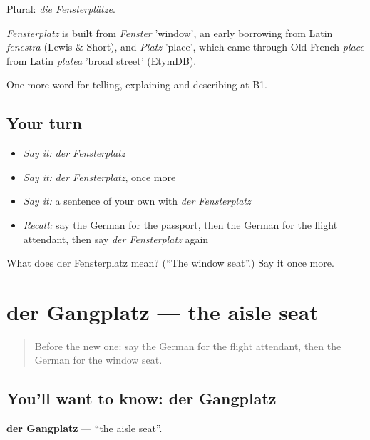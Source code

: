 Plural: \emph{die Fensterplätze}.

\begin{cousinweb}
\emph{Fensterplatz} is built from \emph{Fenster} 'window', an early borrowing from Latin \emph{fenestra} (Lewis \& Short), and \emph{Platz} 'place', which came through Old French \emph{place} from Latin \emph{platea} 'broad street' (EtymDB).
\end{cousinweb}

\begin{grammarlens}[title={What you've built}]
One more word for telling, explaining and describing at B1.
\end{grammarlens}

\subsection*{Your turn}
\begin{itemize}
\raggedright
  \item \emph{Say it:} \emph{der Fensterplatz}
  \item \emph{Say it:} \emph{der Fensterplatz}, once more
  \item \emph{Say it:} a sentence of your own with \emph{der Fensterplatz}
  \item \emph{Recall:} say the German for the passport, then the German for the flight attendant, then say \emph{der Fensterplatz} again
\end{itemize}

\begin{tcolorbox}[breakable,colback=teal!4,colframe=teal!35!black,title={Before you move on}]
What does der Fensterplatz mean? (\textquotedblleft{}The window seat\textquotedblright{}.) Say it once more.
\end{tcolorbox}
\section[der Gangplatz]{der Gangplatz — the aisle seat}

\label{lesson:GE-C418-gangplatz}



\begin{quote}
Before the new one: say the German for the flight attendant, then the German for the window seat.
\end{quote}

\subsection*{You'll want to know: der Gangplatz}
\textbf{der Gangplatz} — \textquotedblleft{}the aisle seat\textquotedblright{}.

